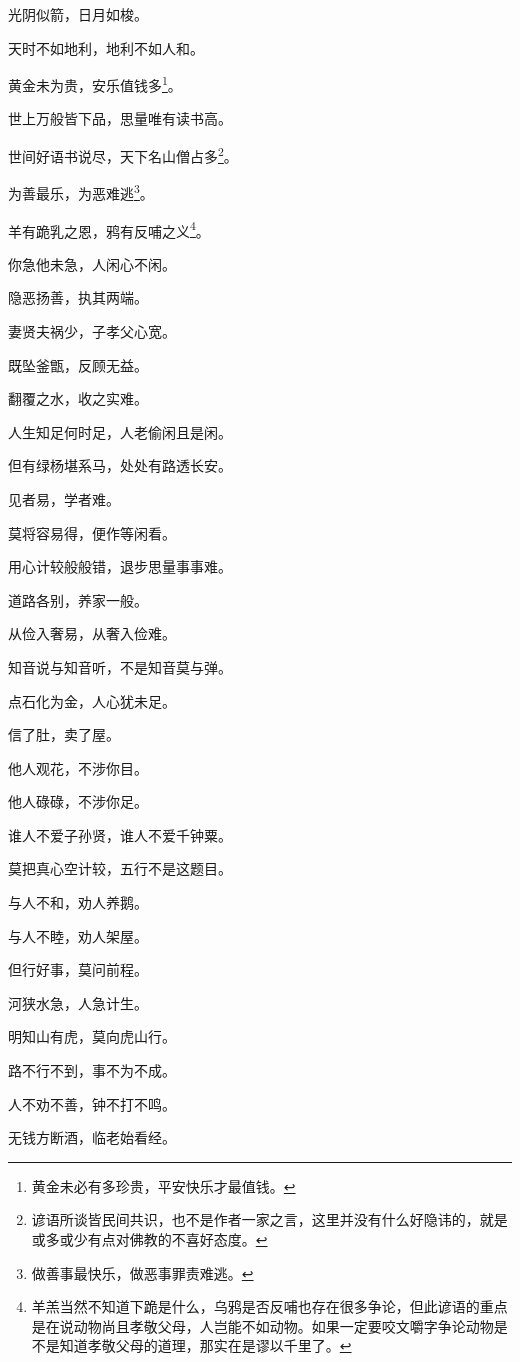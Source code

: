 \documentclass[12pt,oneside]{book}
\begin{document}
光阴似箭，日月如梭。

天时不如地利，地利不如人和。

黄金未为贵，安乐值钱多\footnote{黄金未必有多珍贵，平安快乐才最值钱。}。

世上万般皆下品，思量唯有读书高。

世间好语书说尽，天下名山僧占多\footnote{谚语所谈皆民间共识，也不是作者一家之言，这里并没有什么好隐讳的，就是或多或少有点对佛教的不喜好态度。}。

为善最乐，为恶难逃\footnote{做善事最快乐，做恶事罪责难逃。}。

羊有跪乳之恩，鸦有反哺之义\footnote{羊羔当然不知道下跪是什么，乌鸦是否反哺也存在很多争论，但此谚语的重点是在说动物尚且孝敬父母，人岂能不如动物。如果一定要咬文嚼字争论动物是不是知道孝敬父母的道理，那实在是谬以千里了。}。

你急他未急，人闲心不闲。

隐恶扬善，执其两端。

妻贤夫祸少，子孝父心宽。

既坠釜甑，反顾无益。

翻覆之水，收之实难。

人生知足何时足，人老偷闲且是闲。

但有绿杨堪系马，处处有路透长安。

见者易，学者难。

莫将容易得，便作等闲看。

用心计较般般错，退步思量事事难。

道路各别，养家一般。

从俭入奢易，从奢入俭难。

知音说与知音听，不是知音莫与弹。

点石化为金，人心犹未足。

信了肚，卖了屋。

他人观花，不涉你目。

他人碌碌，不涉你足。

谁人不爱子孙贤，谁人不爱千钟粟。

莫把真心空计较，五行不是这题目。

与人不和，劝人养鹅。

与人不睦，劝人架屋。

但行好事，莫问前程。

河狭水急，人急计生。

明知山有虎，莫向虎山行。

路不行不到，事不为不成。

人不劝不善，钟不打不鸣。

无钱方断酒，临老始看经。
\end{document}
